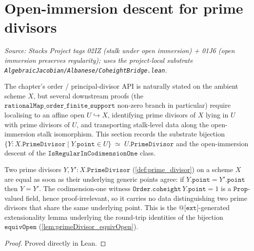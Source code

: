 \section{Open-immersion descent for prime divisors}
\label{sec:open_immersion_descent}
\textit{Source: Stacks Project tags 02IZ (stalk under open immersion) +
01J6 (open immersion preserves regularity); uses the project-local substrate
\texttt{AlgebraicJacobian/Albanese/CoheightBridge.lean}.}

The chapter's order / principal-divisor API is naturally stated on the
ambient scheme \(X\), but several downstream proofs (the
\(\texttt{rationalMap\_order\_finite\_support}\) non-zero branch in
particular) require localising to an affine open \(U \hookrightarrow X\),
identifying prime divisors of \(X\) lying in \(U\) with prime divisors of
\(U\), and transporting stalk-level data along the open-immersion stalk
isomorphism. This section records the substrate bijection
\(\{Y : X.\texttt{PrimeDivisor} \mid Y.\texttt{point} \in U\}
 \;\simeq\; U.\texttt{PrimeDivisor}\)
and the open-immersion descent of the \(\texttt{IsRegularInCodimensionOne}\)
class.

\begin{lemma}

  \label{lem:primeDivisor_ext}
  Two prime divisors \(Y, Y' : X.\texttt{PrimeDivisor}\)
  (\ref{def:prime_divisor}) on a scheme \(X\) are equal as soon as their
  underlying generic points agree: if \(Y.\texttt{point} = Y'.\texttt{point}\)
  then \(Y = Y'\). The codimension-one witness
  \(\texttt{Order.coheight}\,Y.\texttt{point} = 1\) is a \(\texttt{Prop}\)-valued
  field, hence proof-irrelevant, so it carries no data distinguishing two prime
  divisors that share the same underlying point. This is the
  \(\texttt{@[ext]}\)-generated extensionality lemma underlying the round-trip
  identities of the bijection \(\texttt{equivOpen}\)
  (\ref{lem:primeDivisor_equivOpen}).
\end{lemma}
\begin{proof}
  Proved directly in Lean.
\end{proof}

